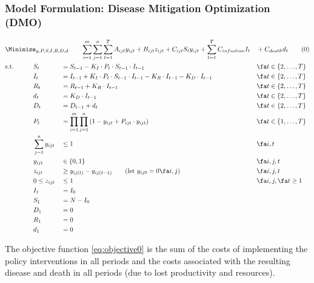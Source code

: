 \documentclass{article}
\newcommand{\model}{{\bf (DMO) }}
\begin{document}
\subsubsection*{Model Formulation: Disease Mitigation Optimization \model}\label{subsec:mathprogram}
{\small
    \begin{alignat}{4}
        &\Minimize_{y,P,S,I,R,D,d}\qquad \span\span\span\span \sum_{i=1}^{m}\sum_{j=1}^{n}\sum_{t=1}^{T}A_{ijt} y_{ijt} + B_{ijt}z_{ijt} + C_{ijt} S_{t}  y_{ijt}  + \sum_{t=1}^{T}C_{infection} I_t &&+ C_{death}  d_t \tag{0}\label{eq:objective0}\\
        & \text{s.t.}\qquad  && S_t &&= S_{t-1} - K_I \cdot P_t \cdot S_{t-1} \cdot I_{t-1} && \fa t \in \{2,\ldots,T\} \label{eq:1}\\
        & {} && I_t &&= I_{t-1} + K_I \cdot P_t \cdot S_{t-1} \cdot I_{t-1} - K_R\cdot I_{t-1} - K_D \cdot I_{t-1} && \fa t \in \{2,\ldots,T\} \label{eq:2}\\
        & {} && R_t &&= R_{t-1} + K_R \cdot I_{t-1} && \fa t \in \{2,\ldots,T\} \label{eq:3}\\
        & {} && d_t &&= K_D \cdot I_{t-1} && \fa t \in \{2,\ldots,T\} \label{eq:4}\\
        & {} && D_t &&= D_{t-1} + d_t && \fa t \in \{2,\ldots,T\} \label{eq:5}\\
        & {} && P_t &&= \prod_{i=1}^{m}\prod_{j=1}^{n}\left(1-y_{ijt} + P_{ijt}\cdot y_{ijt}\right)&& \fa t \in \{1,\ldots,T\} \label{eq:6}\\
        & {} && \sum_{j=1}^{n}y_{ijt}  &&\le 1 && \fa i,t \label{eq:7}\\
        & {} && y_{ijt} &&\in \{0,1\} && \fa i,j,t \label{eq:8}\\
        & {} && z_{ijt} &&\ge y_{ij(t)}-y_{ij(t-1)} \text{\qquad(let $y_{ij0}=0 \fa i,j$)} && \fa i,j, t \label{eq:9}\\
        & {} && 0 \le z_{ijt} &&\le 1 && \fa i,j, \fa t\ge 1 \label{eq:10}\\
        & {} && I_1 &&= I_0 && \nonumber\\
        & {} && S_1 &&= N - I_0 && \nonumber\\
        & {} && D_1 &&= 0 && \nonumber\\
        & {} && R_1 &&= 0 && \nonumber\\
        & {} && d_1 &&= 0 && \nonumber
    \end{alignat}
}


The objective function \eqref{eq:objective0} is the sum of the costs of implementing the policy interventions in all periods and the costs associated with the resulting disease and death in all periods (due to lost productivity and resources).
\end{document}
